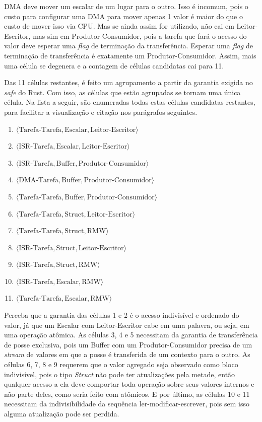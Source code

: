 \begin{sloppypar}
\ac{DMA} deve mover um escalar de um lugar para o outro. Isso é incomum, pois o custo para configurar uma \ac{DMA} para mover apenas 1 valor é maior do que o custo de mover isso via \ac{CPU}. Mas se ainda assim for utilizado, não cai em Leitor-Escritor, mas sim em Produtor-Consumidor, pois a tarefa que fará o acesso do valor deve esperar uma \textit{flag} de terminação da transferência. Esperar uma \textit{flag} de terminação de transferência é exatamente um Produtor-Consumidor. Assim, mais uma célula se degenera e a contagem de células candidatas cai para 11.
\end{sloppypar}

Das 11 células restantes, é feito um agrupamento a partir da garantia exigida no \textit{safe} do Rust. Com isso, as células que estão agrupadas se tornam uma única célula. Na lista a seguir, são enumeradas todas estas células candidatas restantes, para facilitar a visualização e citação nos parágrafos seguintes.

\begin{enumerate}
    \item $\langle\text{Tarefa-Tarefa},\text{Escalar},\text{Leitor-Escritor}\rangle$
    \item $\langle\text{ISR-Tarefa},\text{Escalar},\text{Leitor-Escritor}\rangle$
    \item $\langle\text{ISR-Tarefa},\text{Buffer},\text{Produtor-Consumidor}\rangle$
    \item $\langle\text{DMA-Tarefa},\text{Buffer},\text{Produtor-Consumidor}\rangle$
    \item $\langle\text{Tarefa-Tarefa},\text{Buffer},\text{Produtor-Consumidor}\rangle$
    \item $\langle\text{Tarefa-Tarefa},\text{Struct},\text{Leitor-Escritor}\rangle$
    \item $\langle\text{Tarefa-Tarefa},\text{Struct},\text{RMW}\rangle$
    \item $\langle\text{ISR-Tarefa},\text{Struct},\text{Leitor-Escritor}\rangle$
    \item $\langle\text{ISR-Tarefa},\text{Struct},\text{RMW}\rangle$
    \item $\langle\text{ISR-Tarefa},\text{Escalar},\text{RMW}\rangle$
    \item $\langle\text{Tarefa-Tarefa},\text{Escalar},\text{RMW}\rangle$
\end{enumerate}

Perceba que a garantia das células 1 e 2 é o acesso indivisível e ordenado do valor, já que um Escalar com Leitor-Escritor cabe em uma palavra, ou seja, em uma operação atômica. As células 3, 4 e 5 necessitam da garantia de transferência de posse exclusiva, pois um Buffer com um Produtor-Consumidor precisa de um \textit{stream} de valores em que a posse é transferida de um contexto para o outro. As células 6, 7, 8 e 9 requerem que o valor agregado seja observado como bloco indivisível, pois o tipo \textit{Struct} não pode ter atualizações pela metade, então qualquer acesso a ela deve comportar toda operação sobre seus valores internos e não parte deles, como seria feito com atômicos. E por último, as células 10 e 11 necessitam da indivisibilidade da sequência ler-modificar-escrever, pois sem isso alguma atualização pode ser perdida.

